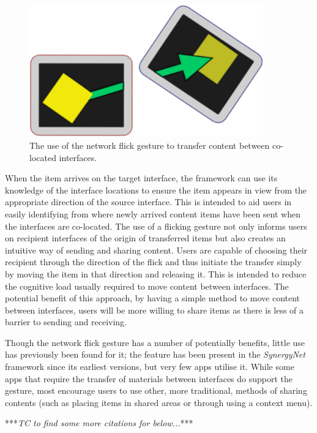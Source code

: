 \documentclass[twocolumn]{svjour3}          %
\begin{document}
\begin{figure}[h]
 \centering
   \includegraphics[width=0.9\textwidth]{figures/flickexample.png}
   \caption{The use of the network flick gesture to transfer content between co-located interfaces.}
   \label{fig:FlickExample}
\end{figure}

When the item arrives on the target interface, the framework can use its knowledge of the interface locations to ensure the item appears in view from the appropriate direction of the source interface.
This is intended to aid users in easily identifying from where newly arrived content items have been sent when the interfaces are co-located.
The use of a flicking gesture not only informs users on recipient interfaces of the origin of transferred items but also creates an intuitive way of sending and sharing content.
Users are capable of choosing their recipient through the direction of the flick and thus initiate the transfer simply by moving the item in that direction and releasing it.
This is intended to reduce the cognitive load usually required to move content between interfaces.
The potential benefit of this approach, by having a simple method to move content between interfaces, users will be more willing to share items as there is less of a barrier to sending and receiving.

Though the network flick gesture has a number of potentially benefits, little use has previously been found for it; the feature has been present in the {\emph{SynergyNet}} framework since its earliest versions, but very few apps utilise it.
While some apps that require the transfer of materials between interfaces do support the gesture, most encourage users to use other, more traditional, methods of sharing contents (such as placing items in shared areas or through using a context menu).

***{\emph{TC to find some more citations for below...}}***
\end{document}
